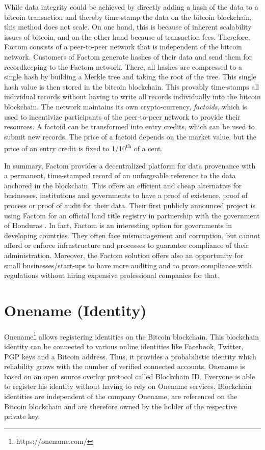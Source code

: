 While data integrity could be achieved by directly adding a hash of the data to 
a bitcoin transaction and thereby time-stamp the data on the bitcoin blockchain, 
this method does not scale. On one hand, this is because of inherent scalability 
issues of bitcoin, and on the other hand because of transaction fees. Therefore, 
Factom consists of a peer-to-peer network that is independent of the bitcoin network. 
Customers of Factom generate hashes of their data and send them for recordkeeping 
to the Factom network. There, all hashes are compressed to a single hash by building 
a Merkle tree and taking the root of the tree. This single hash 
value is then stored in the bitcoin blockchain. This provably time-stamps all individual 
records without having to write all records individually into the bitcoin blockchain. 
The network maintains its own crypto-currency, \emph{factoids}, which is used to incentivize 
participants of the peer-to-peer network to provide their resources. A factoid 
can be transformed into entry credits, which can be used to submit new records. 
The price of a factoid depends on the market value, but the price of an entry credit 
is fixed to 1/10\textsuperscript{th} of a cent. 

In summary, Factom provides a decentralized platform for data provenance with a 
permanent, time-stamped record of an unforgeable reference to the data anchored 
in the blockchain. This offers an efficient and cheap alternative for businesses, 
institutions and governments to have a proof of existence, proof of process or 
proof of audit for their data. Their first publicly announced project is using 
Factom for an official land title registry in partnership with the government of 
Honduras \parencite{Chavez2015}. In fact, Factom is an interesting option for 
governments in developing countries. They often face mismanagement and corruption, 
but cannot afford or enforce infrastructure and processes to guarantee compliance 
of their administration. Moreover, the Factom solution offers also an opportunity 
for small businesses/start-ups to have more auditing and to prove compliance with 
regulations without hiring expensive professional companies for that.

\section{Onename (Identity)}
\label{sec:ecoonename}

Onename\footnote{https://onename.com/} allows registering identities on the Bitcoin blockchain. This blockchain 
identity can be connected to various online identities like Facebook, Twitter, 
PGP keys and a Bitcoin address. Thus, it provides a probabilistic identity which 
reliability grows with the number of verified connected accounts. Onename is based 
on an open source overlay protocol called Blockchain ID. Everyone is able to register 
his identity without having to rely on Onename services. Blockchain identities 
are independent of the company Onename, are referenced on the Bitcoin blockchain 
and are therefore owned by the holder of the respective private key.

